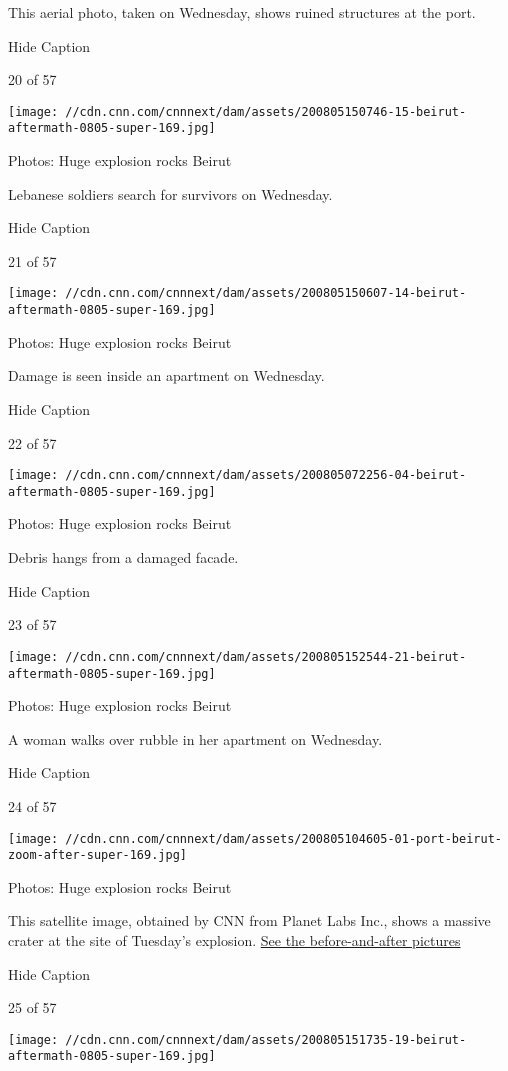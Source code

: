 This aerial photo, taken on Wednesday, shows ruined structures at the
port.

Hide Caption

20 of 57

\texttt{[image: //cdn.cnn.com/cnnnext/dam/assets/200805150746-15-beirut-aftermath-0805-super-169.jpg]}

Photos: Huge explosion rocks Beirut

Lebanese soldiers search for survivors on Wednesday.

Hide Caption

21 of 57

\texttt{[image: //cdn.cnn.com/cnnnext/dam/assets/200805150607-14-beirut-aftermath-0805-super-169.jpg]}

Photos: Huge explosion rocks Beirut

Damage is seen inside an apartment on Wednesday.

Hide Caption

22 of 57

\texttt{[image: //cdn.cnn.com/cnnnext/dam/assets/200805072256-04-beirut-aftermath-0805-super-169.jpg]}

Photos: Huge explosion rocks Beirut

Debris hangs from a damaged facade.

Hide Caption

23 of 57

\texttt{[image: //cdn.cnn.com/cnnnext/dam/assets/200805152544-21-beirut-aftermath-0805-super-169.jpg]}

Photos: Huge explosion rocks Beirut

A woman walks over rubble in her apartment on Wednesday.

Hide Caption

24 of 57

\texttt{[image: //cdn.cnn.com/cnnnext/dam/assets/200805104605-01-port-beirut-zoom-after-super-169.jpg]}

Photos: Huge explosion rocks Beirut

This satellite image, obtained by CNN from Planet Labs Inc., shows a
massive crater at the site of Tuesday's explosion.
\href{https://www.cnn.com/2020/08/05/world/satellite-images-beirut-explosion-before-after-trnd/index.html}{See
the before-and-after pictures}

Hide Caption

25 of 57

\texttt{[image: //cdn.cnn.com/cnnnext/dam/assets/200805151735-19-beirut-aftermath-0805-super-169.jpg]}

